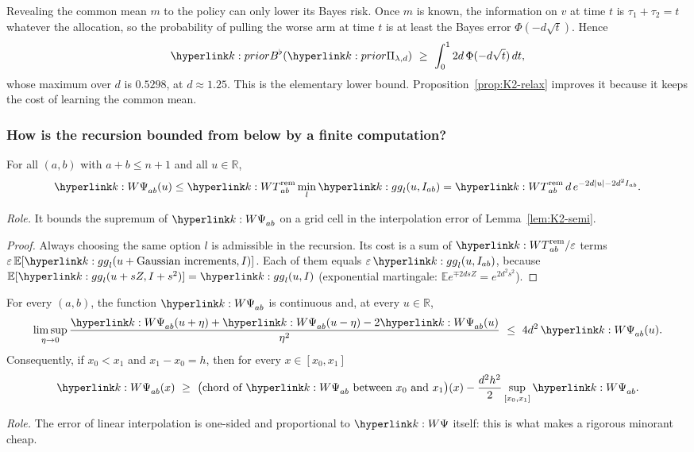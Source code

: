 \documentclass[11pt]{article}
\newcommand{\R}{\mathbb{R}}
\newcommand{\E}{\mathbb{E}}
\newcommand{\1}{\mathbf{1}}
\begin{document}
\begin{remark}\label{rem:K2-known}
Revealing the common mean $m$ to the policy can only lower its Bayes risk. Once $m$ is known, the information on $v$ at time $t$ is $\tau_1+\tau_2=t$ whatever the
allocation, so the probability of pulling the worse arm at time $t$ is at least the Bayes error $\Phi(-d\sqrt t)$. Hence
\[
\kBb(\kPri)\ \ge\ \int_0^12d\,\Phi(-d\sqrt t)\,dt,
\]
whose maximum over $d$ is $0.5298$, at $d\approx1.25$. This is the elementary lower bound. Proposition~\ref{prop:K2-relax} improves it because it keeps the cost of learning the common mean.
\end{remark}

\subsubsection{How is the recursion bounded from below by a finite computation?}\label{sec:K2-scheme}

\begin{lemma}\label{lem:K2-upper}
For all $(a,b)$ with $a+b\le n+1$ and all $u\in\R$,
\[
\kW_{ab}(u)\le\kT_{ab}\min_{l}\kg_l(u,I_{ab})=\kT_{ab}\,d\,e^{-2d|u|-2d^2I_{ab}} .
\]
\end{lemma}
\noindent\textit{Role.} It bounds the supremum of $\kW_{ab}$ on a grid cell in the interpolation error of Lemma~\ref{lem:K2-semi}.
\begin{proof}
Always choosing the same option $l$ is admissible in the recursion. Its cost is a sum of $\kT_{ab}/\varepsilon$ terms $\varepsilon\,\E[\kg_l(u+\text{Gaussian increments},I)]$. Each
of them equals $\varepsilon\,\kg_l(u,I_{ab})$, because $\E[\kg_l(u+sZ,I+s^2)]=\kg_l(u,I)$ (exponential martingale: $\E e^{\mp2dsZ}=e^{2d^2s^2}$).
\end{proof}

\begin{lemma}[semiconcavity]\label{lem:K2-semi}
For every $(a,b)$, the function $\kW_{ab}$ is continuous and, at every $u\in\R$,
\[
\limsup_{\eta\to0}\frac{\kW_{ab}(u+\eta)+\kW_{ab}(u-\eta)-2\kW_{ab}(u)}{\eta^2}\ \le\ 4d^2\,\kW_{ab}(u).
\]
Consequently, if $x_0<x_1$ and $x_1-x_0=h$, then for every $x\in[x_0,x_1]$
\[
\kW_{ab}(x)\ \ge\ \big(\text{chord of }\kW_{ab}\text{ between }x_0\text{ and }x_1\big)(x)-\frac{d^2h^2}{2}\sup_{[x_0,x_1]}\kW_{ab}.
\]
\end{lemma}
\noindent\textit{Role.} The error of linear interpolation is one-sided and proportional to $\kW$ itself: this is what makes a rigorous minorant cheap.
\end{document}

